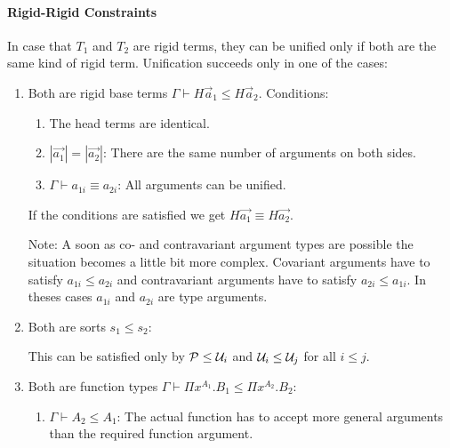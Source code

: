 \paragraph{Rigid-Rigid Constraints}
In case that $T_1$ and $T_2$ are rigid terms, they can be unified only if both are
the same kind of rigid term. Unification succeeds only in one of the cases:

\begin{enumerate}
    \item Both are rigid base terms $\Gamma \vdash H \vec a_1 \le H \vec a_2$.
        Conditions:

        \begin{enumerate}
            \item The head terms are identical.

            \item $|\vec {a_1}| = |\vec {a_2}|$: There are the same number of
                arguments on both sides.

            \item $\Gamma \vdash a_{1i} \equiv a_{2i}$: All arguments can be
                unified.
        \end{enumerate}

        If the conditions are satisfied we get $H \vec {a_1} \equiv H \vec {a_2}$.

        Note: A soon as co- and contravariant argument types are possible the
        situation becomes a little bit more complex. Covariant arguments have to
        satisfy $a_{1i} \le a_{2i}$ and contravariant arguments have to satisfy
        $a_{2i} \le a_{1i}$. In theses cases $a_{1i}$ and $a_{2i}$ are type
        arguments.

    \item Both are sorts $s_1 \le s_2 $:

        This can be satisfied only by
        ${\mathcal P} \le {\mathcal U}_i$
        and
        ${\mathcal U}_i \le {\mathcal U}_j$ for all $i \le j$.

    \item Both are function types
        $\Gamma \vdash \Pi x^{A_1}. B_1
                       \le
                       \Pi x^{A_2}. B_2$:

        \begin{enumerate}
            \item $\Gamma \vdash A_2 \le A_1$: The actual function has
                to accept more general arguments than the required
                function argument.


\end{enumerate}
\end{enumerate}
